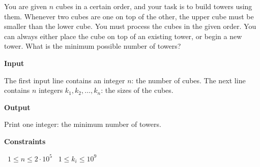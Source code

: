 You are given $n$ cubes in a certain order, and your task is to build towers using them. Whenever two cubes are one on top of the other, the upper cube must be smaller than the lower cube.
You must process the cubes in the given order. You can always either place the cube on top of an existing tower, or begin a new tower. What is the minimum possible number of towers?

\vspace{0.3cm}\noindent\textbf{Input}

The first input line contains an integer $n$: the number of cubes.
The next line contains $n$ integers $k_1,k_2,\ldots,k_n$: the sizes of the cubes.

\vspace{0.3cm}\noindent\textbf{Output}

Print one integer: the minimum number of towers.

\vspace{0.3cm}\noindent\textbf{Constraints}

\textbullet\ $1 \le n \le 2 \cdot 10^5$
\textbullet\ $1 \le k_i \le 10^9$
